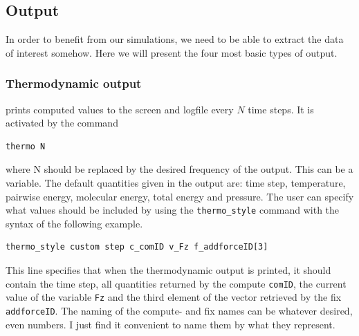 \documentclass[twoside,english]{uiofysmaster}
\begin{document}
\subsection{Output} \label{section:LAMMPSOutput}
In order to benefit from our simulations, we need to be able to extract the data of interest somehow. 
Here we will present the four most basic types of output.




\subsubsection{Thermodynamic output} 
prints computed values to the screen and logfile every $N$ time steps. It is activated by the command 
\begin{lstlisting}[language=LammpsInput]
thermo N
\end{lstlisting} 
where N should be replaced by the desired frequency of the output. This can be a variable.
The default quantities given in the output are: time step,  temperature,  pairwise energy, molecular energy,  total energy and pressure.
The user can specify what values should be included by using the \texttt{thermo\_style} command with the syntax of the following example.
\begin{lstlisting}[language=LammpsInput]
thermo_style custom step c_comID v_Fz f_addforceID[3]
\end{lstlisting} 
This line specifies that when the thermodynamic output is printed, it should contain the time step, all quantities returned by the compute \texttt{comID}, the current value of the variable \texttt{Fz} and the third element of the vector retrieved by the fix \texttt{addforceID}. The naming of the compute- and fix names can be whatever desired, even numbers.
I just find it convenient to name them by what they represent. 
\end{document}
